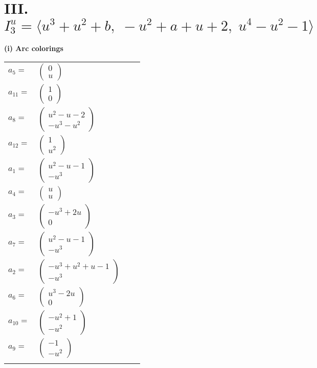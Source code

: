 \documentclass[1p]{elsarticle_modified}
\theoremstyle{definition}
\begin{document}
\centering \section*{III. $I^u_{3}= \langle u^3+u^2+b,\;- u^2+a+u+2,\;u^4- u^2-1 \rangle$}
\flushleft \textbf{(i) Arc colorings}\\
\begin{tabular}{m{7pt} m{180pt} m{7pt} m{180pt} }
\flushright $a_{5}=$&$\begin{pmatrix}0\\u\end{pmatrix}$ \\
\flushright $a_{11}=$&$\begin{pmatrix}1\\0\end{pmatrix}$ \\
\flushright $a_{8}=$&$\begin{pmatrix}u^2- u-2\\- u^3- u^2\end{pmatrix}$ \\
\flushright $a_{12}=$&$\begin{pmatrix}1\\u^2\end{pmatrix}$ \\
\flushright $a_{1}=$&$\begin{pmatrix}u^2- u-1\\- u^3\end{pmatrix}$ \\
\flushright $a_{4}=$&$\begin{pmatrix}u\\u\end{pmatrix}$ \\
\flushright $a_{3}=$&$\begin{pmatrix}- u^3+2 u\\0\end{pmatrix}$ \\
\flushright $a_{7}=$&$\begin{pmatrix}u^2- u-1\\- u^3\end{pmatrix}$ \\
\flushright $a_{2}=$&$\begin{pmatrix}- u^3+u^2+u-1\\- u^3\end{pmatrix}$ \\
\flushright $a_{6}=$&$\begin{pmatrix}u^3-2 u\\0\end{pmatrix}$ \\
\flushright $a_{10}=$&$\begin{pmatrix}- u^2+1\\- u^2\end{pmatrix}$ \\
\flushright $a_{9}=$&$\begin{pmatrix}-1\\- u^2\end{pmatrix}$\\&\end{tabular}
\end{document}
